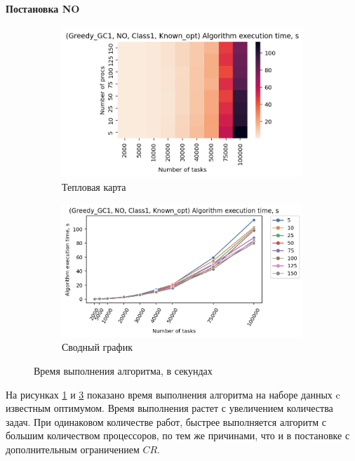 \paragraph{Постановка NO}

\begin{figure}[!htbp]
    \centering
    \begin{subfigure}{0.49\textwidth}
        \includegraphics[width=\textwidth]{imgs/ideal_1/NO/et_heatmap.png}
        \caption{Тепловая карта}
        \label{fig:NO-exec-time-heatmap}
    \end{subfigure}
    \hfill
    \begin{subfigure}{0.49\textwidth}
        \includegraphics[width=\textwidth]{imgs/ideal_1/NO/tr_graph.png}
        \caption{Сводный график}
        \label{fig:NO-exec-time-compiled}
    \end{subfigure}
    \caption{Время выполнения алгоритма, в секундах}
\end{figure}

На рисунках \ref{fig:NO-exec-time-heatmap} и \ref{fig:NO-exec-time-compiled} показано время выполнения алгоритма на наборе данных c известным оптимумом. Время выполнения растет с увеличением количества задач. При одинаковом количестве работ, быстрее выполняется алгоритм с большим количеством процессоров, по тем же причинами, что и в постановке с дополнительным ограничением $CR$. 

